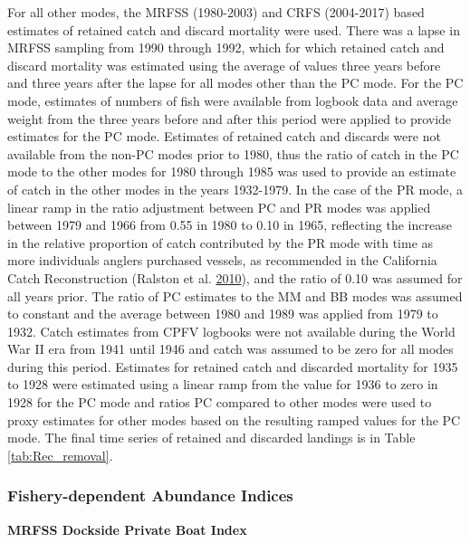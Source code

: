 \documentclass[12pt,]{article}
\begin{document}
For all other modes, the MRFSS (1980-2003) and CRFS (2004-2017) based
estimates of retained catch and discard mortality were used. There was a
lapse in MRFSS sampling from 1990 through 1992, which for which retained
catch and discard mortality was estimated using the average of values
three years before and three years after the lapse for all modes other
than the PC mode. For the PC mode, estimates of numbers of fish were
available from logbook data and average weight from the three years
before and after this period were applied to provide estimates for the
PC mode. Estimates of retained catch and discards were not available
from the non-PC modes prior to 1980, thus the ratio of catch in the PC
mode to the other modes for 1980 through 1985 was used to provide an
estimate of catch in the other modes in the years 1932-1979. In the case
of the PR mode, a linear ramp in the ratio adjustment between PC and PR
modes was applied between 1979 and 1966 from 0.55 in 1980 to 0.10 in
1965, reflecting the increase in the relative proportion of catch
contributed by the PR mode with time as more individuals anglers
purchased vessels, as recommended in the California Catch Reconstruction
(Ralston et al. \protect\hyperlink{ref-Ralston2010}{2010}), and the
ratio of 0.10 was assumed for all years prior. The ratio of PC estimates
to the MM and BB modes was assumed to constant and the average between
1980 and 1989 was applied from 1979 to 1932. Catch estimates from CPFV
logbooks were not available during the World War II era from 1941 until
1946 and catch was assumed to be zero for all modes during this period.
Estimates for retained catch and discarded mortality for 1935 to 1928
were estimated using a linear ramp from the value for 1936 to zero in
1928 for the PC mode and ratios PC compared to other modes were used to
proxy estimates for other modes based on the resulting ramped values for
the PC mode. The final time series of retained and discarded landings is
in Table \ref{tab:Rec_removal}.

\subsubsection{Fishery-dependent Abundance
Indices}\label{fishery-dependent-abundance-indices}

\textbf{MRFSS Dockside Private Boat Index}
\end{document}
